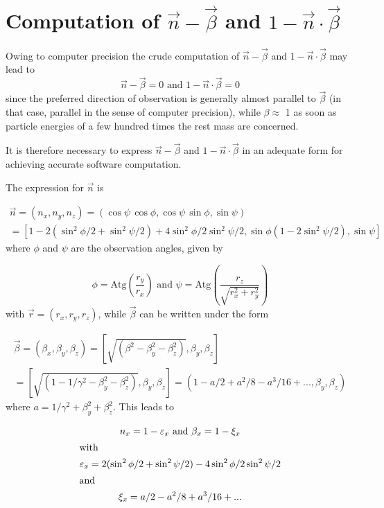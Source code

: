 \section*{Computation of $\vec{n} - \vec{\beta}$ and $1 - \vec{n} \cdot \vec{\beta}$}
 
Owing to computer precision the crude computation of $\vec{n} -
\vec{\beta}$ and $ 1 -\vec{n}\cdot \vec{\beta}$ may lead to
$$
	\vec{n} - \vec{\beta} = 0 \text{ and } 1 - \vec{n}\cdot \vec{\beta} = 0
$$
since the preferred direction of observation is generally almost parallel to
$\vec{\beta}$ (in that case, parallel in the sense of computer precision), while $\beta
\approx$ 1 as soon as particle energies of a few hundred times the rest mass are
concerned.

\noindent It is therefore necessary to express $\vec{n} - \vec{\beta}$ 
and $1 -\vec{n} \cdot
\vec{\beta}$ in an adequate  form for achieving accurate software  computation.

\noindent The expression for $\vec{n}$ is

\begin{multline} \label{eqN4.5}
	\vec{n} = (n_x, n_y, n_z) = (\cos \psi\,\cos \phi, \cos \psi \,\sin 
		\phi, \sin \psi)  \\
	= \left[1 - 2 (\sin^2\phi/2 + \sin^2 \psi/2) + 4 \sin^2\phi/2 \sin^2\psi/2, 
		\sin \phi (1 - 2\sin^2\psi/2), \sin \psi \right]
\end{multline}
%
where $\phi$ and $\psi$ are the observation angles, given by 

\begin{equation}
	\phi = \text{Atg} \left( \dfrac{r_y}{ r_x}\right)
	\text{ and }  \psi = \text{Atg}\left( \dfrac{r_z}{\sqrt{r_x^2 + r_y^2}}\right) \label{eqN4.6}
\end{equation} %
%
with $\vec{r} = (r_x, r_y, r_z)$, while $\vec{\beta}$ can be written under the form

\begin{multline} \label{eqN4.7}
	\vec{\beta} = (\beta_x, \beta_y, \beta_z) = 
		\left[ \sqrt{(\beta^2 - \beta^2_y - \beta_z^2)},\beta_y, \beta_z 
		\right] \\
	= \left[ \sqrt{(1 - 1/\gamma^2 - \beta_y^2 - \beta_z^2)}, \beta_y, 
		\beta_z \right] = (1 - a/2 + a^2/8 - a^3/16 +...,\beta_y, \beta_z) 
\end{multline}
%
where $a = 1/ \gamma^2 + \beta^2_y + \beta^2_z$. This leads to

\begin{gather*}
	n_x = 1 - \varepsilon_x 
		\text{ and } \beta_x = 1 - \xi_x  \\
\intertext{with}
\varepsilon_x = 2 (\sin^2\phi/2 + \sin^2\psi/2) - 4 \sin^2\phi/2  \sin^2\psi/2 \\
\intertext{and}
\xi_x = a/2 - a^2/8 + a^3/16 +...
\end{gather*}

